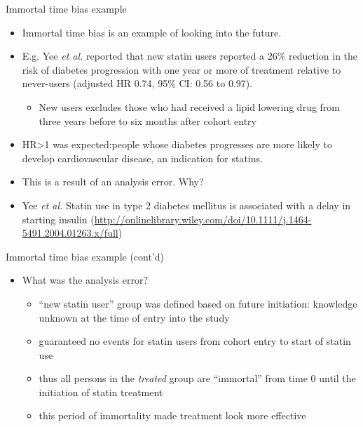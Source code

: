 \documentclass[
  ignorenonframetext,
]{beamer}
\providecommand{\tightlist}{%
  \setlength{\itemsep}{0pt}\setlength{\parskip}{0pt}}
\begin{document}
\begin{frame}{Immortal time bias example}
\protect\hypertarget{immortal-time-bias-example}{}

\begin{itemize}
\tightlist
\item
  Immortal time bias is an example of looking into the future.
\item
  E.g. Yee \emph{et al.} reported that new statin users reported a 26\%
  reduction in the risk of diabetes progression with one year or more of
  treatment relative to never-users (adjusted HR 0.74, 95\% CI: 0.56 to
  0.97).

  \begin{itemize}
  \tightlist
  \item
    New users excludes those who had received a lipid lowering drug from
    three years before to six months after cohort entry
  \end{itemize}
\item
  HR\textgreater1 was expected:people whose diabetes progresses are more
  likely to develop cardiovascular disease, an indication for statins.
\item
  This is a result of an analysis error. Why?
\end{itemize}

\tiny

\begin{itemize}
\tightlist
\item
  Yee \emph{et al.} Statin use in type 2 diabetes mellitus is associated
  with a delay in starting insulin
  (\url{http://onlinelibrary.wiley.com/doi/10.1111/j.1464-5491.2004.01263.x/full})
\end{itemize}

\end{frame}

\begin{frame}{Immortal time bias example (cont'd)}
\protect\hypertarget{immortal-time-bias-example-contd}{}

\begin{itemize}
\tightlist
\item
  What was the analysis error?

  \begin{itemize}
  \tightlist
  \item
    ``new statin user'' group was defined based on future initiation:
    knowledge unknown at the time of entry into the study
  \item
    guaranteed no events for statin users from cohort entry to start of
    statin use
  \item
    thus all persons in the \emph{treated} group are ``immortal'' from
    time 0 until the initiation of statin treatment
  \item
    this period of immortality made treatment look more effective
  \end{itemize}
\end{itemize}

\end{frame}
\end{document}
